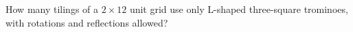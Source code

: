 How many tilings of a $2\times12$ unit grid use only L-shaped three-square trominoes, with rotations and reflections allowed?

